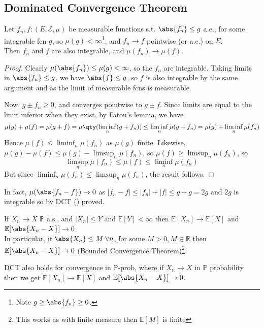 \subsection{Dominated Convergence Theorem}
\begin{theorem} \label{thm:dct}
	Let $f_n, f \colon (E, \mathcal E, \mu)$ be measurable functions s.t. $\abs{f_n} \leq g$ a.e., for some integrable fcn $g$, so $\mu(g) < \infty$\footnote{Note $g \geq \abs{f_n} \geq 0$.}, and $f_n \to f$ pointwise (or a.e.) on $E$. \\
	Then $f_n$ and $f$ are also integrable, and $\mu(f_n) \to \mu(f)$.
\end{theorem}

\begin{proof}
	Clearly $\mu(\abs{f_n}) \leq \mu(g) < \infty$, so the $f_n$ are integrable.
	Taking limits in $\abs{f_n} \leq g$, we have $\abs{f} \leq g$, so $f$ is also integrable by the same argument and as the limit of measurable fcns is measurable.

	Now, $g \pm f_n \geq 0$, and converges pointwise to $g \pm f$.
	Since limits are equal to the limit inferior when they exist, by Fatou's lemma, we have
	\[ \mu(g) + \mu(f) = \mu(g + f) = \mu\qty(\liminf_n (g + f_n)) \leq \liminf_n \mu(g + f_n) = \mu(g) + \liminf_n \mu(f_n) \]
	Hence $\mu(f) \leq \liminf_n \mu(f_n)$ as $\mu(g)$ finite.
	Likewise, $\mu(g) - \mu(f) \leq \mu(g) - \limsup_n \mu(f_n)$, so $\mu(f) \geq \limsup_n \mu(f_n)$, so
	\[ \limsup_n \mu(f_n) \leq \mu(f) \leq \liminf_n \mu(f_n) \]
	But since $\liminf_n \mu(f_n) \leq \limsup_n \mu(f_n)$, the result follows.
\end{proof}

\begin{remark}
	In fact, $\mu(\abs{f_n - f}) \to 0$ as $|f_n - f| \leq |f_n| + |f| \leq g + g = 2g$ and $2g$ is integrable so by DCT () proved.

	If $X_n \to X$ $\mathbb{P}$ a.s., and $|X_n| \leq Y$ and $\mathbb{E}[Y] < \infty$ then $\mathbb{E}[X_n] \to \mathbb{E}[X]$ and $\mathbb{E}[\abs{X_n - X}] \to 0$. \\
	In particular, if $\abs{X_n} \leq M \; \forall n$, for some $M > 0, M \in \mathbb{R}$ then $\mathbb{E}[\abs{X_n - X}] \to 0$ (Bounded Convergence Theorem)\footnote{This works as with finite measure then $\mathbb{E}[M]$ is finite}.
\end{remark}

\begin{remark}
	DCT also holds for convergence in $\mathbb{P}$-prob, where if $X_n \to X$ in $\mathbb{P}$ probability then we get $\mathbb{E}[X_n] \to \mathbb{E}[X]$ and $\mathbb{E}[\abs{X_n - X}] \to 0$.
\end{remark}

